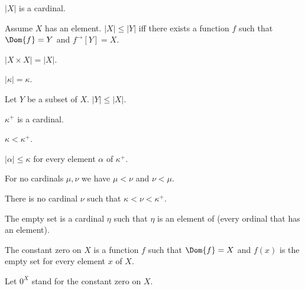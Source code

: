 \documentclass{article}
\newcommand{\Prod}[2]{#1\times #2}
\newcommand{\Succ}[1]{#1^{+}}
\newcommand{\image}[2]{#1^{\to}[#2]}
\newcommand{\card}[1]{\left|#1\right|}
\begin{document}
  \begin{forthel}
    \begin{signature}[Cardinality]
      $\card{X}$ is a cardinal.
    \end{signature}

    \begin{axiom}
      Assume $X$ has an element.
      $\card{X} \leq \card{Y}$ iff
        there exists a function $f$ such that
          $\Dom{f} = Y$ and $\image{f}{Y} = X$.
    \end{axiom}

    \begin{axiom}
      $\card{\Prod{X}{X}} = \card{X}$.
    \end{axiom}

    \begin{axiom}
      $\card{\kappa} = \kappa$.
    \end{axiom}

    \begin{axiom}
      Let $Y$ be a subset of $X$. $\card{Y} \leq \card{X}$.
    \end{axiom}

    \begin{signature}
      $\Succ{\kappa}$ is a cardinal.
    \end{signature}

    \begin{axiom}
      $\kappa < \Succ{\kappa}$.
    \end{axiom}

    \begin{axiom}
      $\card{\alpha} \leq \kappa$ for every element $\alpha$ of $\Succ{\kappa}$.
    \end{axiom}

    \begin{axiom}
      For no cardinals $\mu, \nu$ we have $\mu < \nu$ and $\nu < \mu$.
    \end{axiom}

    \begin{axiom}
      There is no cardinal $\nu$ such that $\kappa < \nu < \Succ{\kappa}$.
    \end{axiom}

    \begin{definition}
      The empty set is a cardinal $\eta$ such that $\eta$
      is an element of (every ordinal that has an element).
    \end{definition}

    \begin{definition}
      The constant zero on $X$ is a function $f$ such that $\Dom{f} = X$ and $f(x)$ is the empty set for every element $x$ of $X$.
    \end{definition}

    Let $0^X$ stand for the constant zero on $X$.
  \end{forthel}
\end{document}
